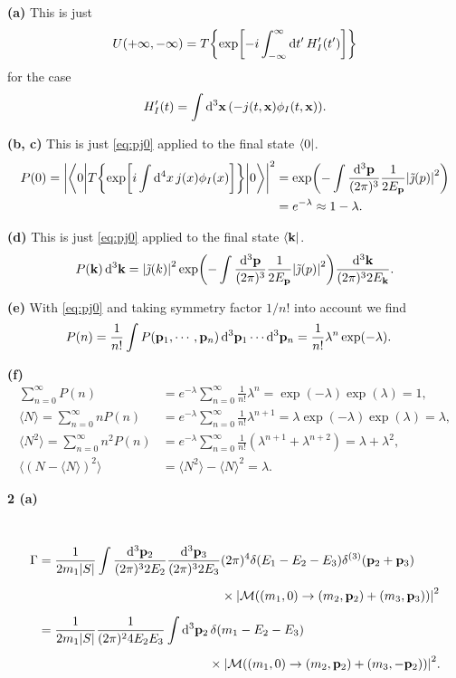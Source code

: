 \documentclass{article}
\makeatletter
\newcommand*{\shifttext}[1]{%
  \settowidth{\@tempdima}{#1}%
  \hspace{-\@tempdima}#1%
}
\newcommand{\plabel}[1]{%
\shifttext{\textbf{#1}\quad}%
}
\newcommand{\prule}{%
\begin{center}%
\hdashrule[0.5ex]{.99\linewidth}{1pt}{1pt 2.5pt}%
\end{center}%
}
\newcommand{\minusbaseline}{\abovedisplayskip=0pt\abovedisplayshortskip=0pt~\vspace*{-\baselineskip}}%
\makeatother
\begin{document}
\plabel{(a)}%
This is just
\[ U(+\infty,-\infty) = T\qty{\exp[-i\int_{-\infty}^\infty \dd{t'} H'_I(t')]} \]
for the case
\[ H'_I(t) = \int \dd[3]{\vb{x}} (-j(t,\vb{x}) \phi_I(t,\vb{x})). \]

\plabel{(b, c)}%
This is just \cref{eq:pj0} applied to the final state $\bra{0}$.
\begin{align*}
    P(0) = \abs{\mel**{0}{T\qty{\exp[i\int \dd[4]{x} j(x)\phi_I(x)]}}{0}}^2 &= \exp(-\int \frac{\dd[3]{\vb{p}}}{(2\pi)^3}\frac{1}{2E_{\vb{p}}}\abs{\tilde{\jmath}(p)}^2) \\
    &= e^{-\lambda} \approx 1 - \lambda.
\end{align*}

\plabel{(d)}%
This is just \cref{eq:pj0} applied to the final state $\bra{\vb{k}}$.
\[ P(\vb{k}) \dd[3]{\vb{k}} = \abs{\tilde{\jmath}(k)}^2 \exp(-\int \frac{\dd[3]{\vb{p}}}{(2\pi)^3}\frac{1}{2E_{\vb{p}}}\abs{\tilde{\jmath}(p)}^2) \frac{\dd[3]{\vb{k}}}{(2\pi)^3 2E_{\vb{k}}}. \]

\plabel{(e)}%
With \cref{eq:pj0} and taking symmetry factor $1/n!$ into account we find
\begin{align*}
    P(n) &= \frac{1}{n!} \int P(\vb{p}_1,\cdots,\vb{p}_n) \dd[3]{\vb{p}_1} \cdots \dd[3]{\vb{p}_n} = \frac{1}{n!} \lambda^n \exp(-\lambda).
\end{align*}

\plabel{(f)}%
\begingroup\minusbaseline
\begin{align*}
    \sum_{n=0}^\infty P(n) &= e^{-\lambda} \sum_{n=0}^\infty \frac{1}{n!}\lambda^n = \exp(-\lambda) \exp(\lambda) = 1, \\
    \langle N \rangle = \sum_{n=0}^\infty nP(n) &= e^{-\lambda} \sum_{n=0}^\infty \frac{1}{n!}\lambda^{n+1} = \lambda \exp(-\lambda) \exp(\lambda) = \lambda, \\
    \langle N^2 \rangle = \sum_{n=0}^\infty n^2P(n) &= e^{-\lambda} \sum_{n=0}^\infty \frac{1}{n!}(\lambda^{n+1} + \lambda^{n+2}) = \lambda + \lambda^2, \\
    \langle (N - \langle N\rangle)^2 \rangle &= \langle N^2 \rangle - \langle N \rangle^2 = \lambda.
\end{align*}
\endgroup

\prule

\plabel{2 (a)}
\begingroup\minusbaseline
\begin{align*}
    \Gamma &= \frac{1}{2m_1\abs{S}} \int \frac{\dd[3]{\vb{p}_2}}{(2\pi)^3 2E_2} \frac{\dd[3]{\vb{p}_3}}{(2\pi)^3 2E_3} (2\pi)^4 \delta(E_1 - E_2 - E_3) \delta^{(3)}(\vb{p}_2 + \vb{p}_3) \\
    &\phantom{{}=\frac{1}{2m_1\abs{S}} \int \frac{\dd[3]{\vb{p}_2}}{(2\pi)^3 2E_2} \frac{\dd[3]{\vb{p}_3}}{(2\pi)^3 2E_3}}{} \times \abs{\mathcal{M}((m_1,0) \rightarrow (m_2,\vb{p}_2) + (m_3,\vb{p}_3))}^2 \\
    &= \frac{1}{2m_1\abs{S}} \frac{1}{(2\pi)^2 4E_2 E_3} \int \dd[3]{\vb{p}_2} \delta(m_1 - E_2 - E_3) \\
    &{\phantom{{}=\frac{1}{2m_1\abs{S}} \frac{1}{(2\pi)^2 4E_2 E_3} \int \dd[3]{\vb{p}_2}}} {} \times \abs{\mathcal{M}((m_1,0) \rightarrow (m_2,\vb{p}_2) + (m_3,-\vb{p}_2))}^2.
\end{align*}
\endgroup
\end{document}
